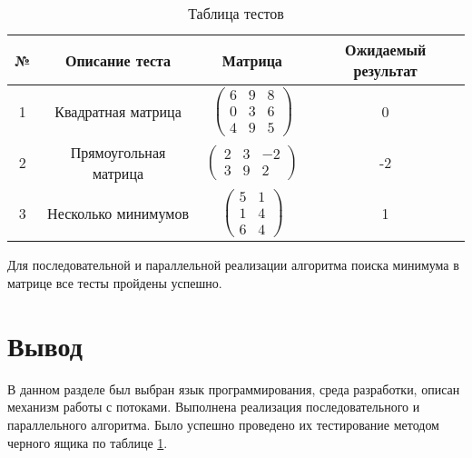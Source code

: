 \begin{table}[ht!]
	\centering
	\captionsetup{singlelinecheck = false, justification=raggedright}
	\caption{Таблица тестов}
	\label{table:ref1}
	\begin{tabular}{|c|c|c|c|}
		\hline
		№ &Описание теста & Матрица  &    Ожидаемый результат\\\hline
		1& Квадратная матрица  & $\begin{pmatrix}6 & 9 & 8\\0 & 3 & 6\\4 & 9 & 5\end{pmatrix}$ & 0
		\\ \hline
		2& Прямоугольная матрица	  & $\begin{pmatrix}2 & 3 & -2\\3 & 9 & 2\end{pmatrix}$ & -2
		\\ \hline
		3& Несколько минимумов		& $\begin{pmatrix}5 & 1\\1 & 4\\6 & 4\end{pmatrix}$ & 1
		\\ \hline
	\end{tabular}
\end{table}
	Для последовательной и параллельной реализации алгоритма поиска минимума в матрице все тесты пройдены успешно.
\section{Вывод}
В данном разделе был выбран язык программирования, среда разработки, описан механизм работы с потоками. Выполнена реализация последовательного и параллельного алгоритма. Было успешно проведено их тестирование методом черного ящика по таблице \ref{table:ref1}. 

